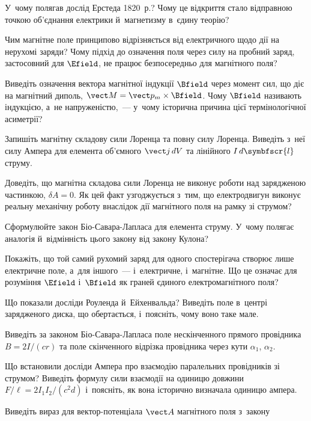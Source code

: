 \begin{Questions}
	\begin{quizlist}
		\item У~чому полягав дослід Ерстеда 1820~р.? Чому це відкриття стало відправною точкою
		об'єднання електрики й~магнетизму в~єдину теорію?
		\item Чим магнітне поле принципово відрізняється від електричного щодо дії на нерухомі
		заряди? Чому підхід до означення поля через силу на пробний заряд, застосовний для
		$\Efield$, не працює безпосередньо для магнітного поля?
		\item Виведіть означення вектора магнітної індукції $\Bfield$ через момент сил, що діє
		на магнітний диполь, $\vect M = \vect p_m\times\Bfield$. Чому $\Bfield$ називають
		індукцією, а~не напруженістю,~--- у~чому історична причина цієї термінологічної
		асиметрії?
		\item Запишіть магнітну складову сили Лоренца та повну силу Лоренца. Виведіть з~неї
		силу Ампера для елемента об'ємного $\vect j\,dV$ та лінійного $I\,d\symbfscr{l}$
		струму.
		\item Доведіть, що магнітна складова сили Лоренца не виконує роботи над зарядженою
		частинкою, $\delta A = 0$. Як цей факт узгоджується з~тим, що електродвигун виконує
		реальну механічну роботу внаслідок дії магнітного поля на рамку зі струмом?
		\item Сформулюйте закон Біо-Савара-Лапласа для елемента струму. У~чому полягає
		аналогія й~відмінність цього закону від закону Кулона?
		\item Покажіть, що той самий рухомий заряд для одного спостерігача створює лише
		електричне поле, а~для іншого~--- і~електричне, і~магнітне. Що це означає для
		розуміння $\Efield$ і~$\Bfield$ як граней єдиного електромагнітного поля?
		\item Що показали досліди Роуленда й~Ейхенвальда? Виведіть поле в~центрі зарядженого
		диска, що обертається, і~поясніть, чому воно таке мале.
		\item Виведіть за законом Біо-Савара-Лапласа поле нескінченного прямого провідника
		$B=2I/(cr)$ та поле скінченного відрізка провідника через кути $\alpha_1$,
		$\alpha_2$.
		\item Що встановили досліди Ампера про взаємодію паралельних провідників зі струмом?
		Виведіть формулу сили взаємодії на одиницю довжини $F/\ell = 2I_1I_2/(c^2d)$
		і~поясніть, як вона історично визначала одиницю ампера.
		\item Виведіть вираз для вектор-потенціала $\vect A$ магнітного поля з~закону

\end{quizlist}
\end{Questions}
